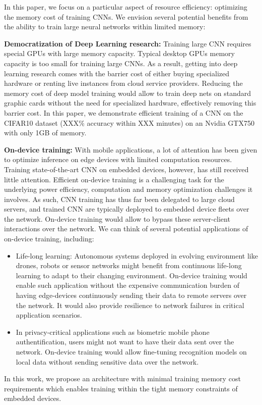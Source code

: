 \documentclass[twocolumn]{bmcart}
\begin{document}
In this paper, we focus on a particular aspect of resource efficiency: optimizing the memory cost of training CNNs. 
We envision several potential benefits from the ability to train large neural networks within limited memory:

\textbf{Democratization of Deep Learning research:} 
Training large CNN requires special GPUs with large memory capacity. 
Typical desktop GPUs memory capacity is too small for training large CNNs.
As a result, getting into deep learning research comes with the barrier cost of either buying specialized hardware or renting live instances from cloud service providers. 
Reducing the memory cost of deep model training would allow to train deep nets on standard graphic cards without the need for specialized hardware, effectively removing this barrier cost.
In this paper, we demonstrate efficient training of a CNN on the CIFAR10 dataset (XXX\% accuracy within XXX minutes) on an Nvidia GTX750 with only 1GB of memory.

\textbf{On-device training:}
With mobile applications, a lot of attention has been given to optimize inference on edge devices with limited computation resources.
Training state-of-the-art CNN on embedded devices, however, has still received little attention.
Efficient on-device training is a challenging task for the underlying power efficiency, computation and memory optimization challenges it involves.
As such, CNN training has thus far been delegated to large cloud servers, and trained CNN are typically deployed to embedded device fleets over the network.  
On-device training would allow to bypass these server-client interactions over the network. 
We can think of several potential applications of on-device training, including:
\begin{itemize}
 \item Life-long learning: Autonomous systems deployed in evolving environment like drones, robots or sensor networks might benefit from continuous life-long learning to adapt to their changing environment. 
On-device training would enable such application without the expensive communication burden of having edge-devices continuously sending their data to remote servers over the network. It would also provide resilience to network failures in critical application scenarios.
 \item In privacy-critical applications such as biometric mobile phone authentification, users might not want to have their data sent over the network. 
On-device training would allow fine-tuning recognition models on local data without sending sensitive data over the network.
\end{itemize}
In this work, we propose an architecture with minimal training memory cost requirements which enables training within the tight memory constraints of embedded devices. 
\end{document}
